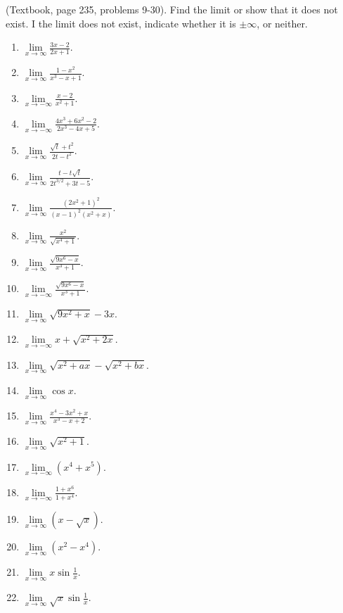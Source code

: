 (Textbook, page 235, problems 9-30).
Find the limit or show that it does not exist. I the limit does not exist, indicate whether it is $\pm\infty$, or neither. 
\begin{multicols}{3}
\begin{enumerate}
\item $\lim\limits_{x\to\infty }\frac{3x-2}{2x+1}$.
\item $\lim\limits_{x\to\infty }\frac{1-x^2}{x^3-x+1}$.
\item $\lim\limits_{x\to-\infty }\frac{x-2}{x^2+1}$.
\item $\lim\limits_{x\to-\infty }\frac{4x^3+6x^2-2}{2x^3-4x+5}$.
\item $\lim\limits_{x\to\infty }\frac{\sqrt{t}+t^2}{2t-t^2}$.
\item $\lim\limits_{x\to\infty }\frac{t-t\sqrt{t}}{2t^{3/2}+3t-5}$.
\item $\lim\limits_{x\to\infty }\frac{(2x^2+1)^2}{(x-1)^2(x^2+x)}$.
\item $\lim\limits_{x\to\infty }\frac{x^2}{\sqrt{x^4+1}}$.
\item $\lim\limits_{x\to\infty }\frac{\sqrt{9x^6-x}}{x^3+1}$.
\item $\lim\limits_{x\to-\infty }\frac{\sqrt{9x^6-x}}{x^3+1}$.
\item $\lim\limits_{x\to\infty}\sqrt{9x^2+x}-3x$.

\item $\lim\limits_{x\to-\infty}x+\sqrt{x^2+2x} $.

\item $\lim\limits_{x\to\infty}\sqrt{x^2+ax}-\sqrt{x^2+bx}$.

\item $\lim\limits_{x\to\infty}\cos x$.
\item $\lim\limits_{x\to\infty}\frac{x^4-3x^2+x}{x^3-x+2}$.

\answer{$\infty$}
\item $\lim\limits_{x\to\infty}\sqrt{x^2+1}$.

\answer{$\infty$}
\item $\lim\limits_{x\to-\infty}(x^4+x^5)$.

\answer{$-\infty$}
\item $\lim\limits_{x\to-\infty}\frac{1+x^6}{1+x^4}$.

\answer{$\infty$}
\item $\lim\limits_{x\to\infty}(x-\sqrt{x})$.

\answer{$\infty$}
\item $\lim\limits_{x\to\infty}(x^2-x^4)$.

\answer{$-\infty$}
\item $\lim\limits_{x\to\infty}x\sin \frac{1}{x}$.

\item $\lim\limits_{x\to\infty}\sqrt{x}\sin \frac{1}{x}$.

\end{enumerate}
\end{multicols}